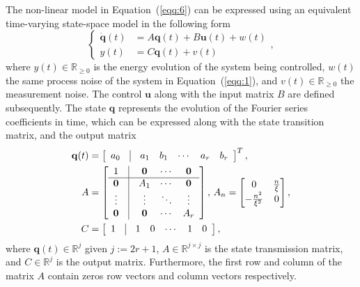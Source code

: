 \documentclass[letterpaper,10pt,conference]{ieeeconf}
\begin{document}
The non-linear model in Equation~(\ref{eqq:6}) can be expressed using an equivalent time-varying state-space model in the following form
\begin{equation}\label{eqq:7}\begin{cases}
  \dot{\mathbf{q}}(t)&=A\mathbf{q}(t)+B\mathbf{u}(t)+w(t)\\
  y(t)&=C\mathbf{q}(t)+v(t)
\end{cases},\end{equation}
where $y(t)\in\mathbb{R}_{\geq 0}$ is the energy evolution of the system being controlled, $w(t)$ the same process noise of the system in Equation~(\ref{eqq:1}), and $v(t)\in\mathbb{R}_{\geq 0}$ the measurement noise. The control $\mathbf{u}$ along with the input matrix $B$ are defined subsequently. The state $\mathbf{q}$ represents the evolution of the Fourier series coefficients in time, which can be expressed along with the state transition matrix, and the output matrix
\begin{equation}\begin{split}
  \mathbf{q}(t)&=\left[\begin{array}{ccccccc}
    a_0 & \vline & a_1 & b_1 & \cdots & a_r & b_r
  \end{array}\right]^T,\\
  A&=\left[\begin{array}{ccccc}
    1          & \vline & \mathbf{0} & \cdots & \mathbf{0} \\\hline
    \mathbf{0} & \vline & A_1        & \cdots & \mathbf{0} \\
    \vdots     & \vline & \vdots     & \ddots & \vdots     \\
    \mathbf{0} & \vline & \mathbf{0} & \cdots & A_r 
  \end{array}\right],\,A_n=\begin{bmatrix}0 & \frac{n}{\xi} \\ -\frac{n^2}{\xi^2} & 0\end{bmatrix},\\
  C&=\left[\begin{array}{ccccccc}
    1 & \vline & 1 & 0 & \cdots & 1 & 0
  \end{array}\right],
\end{split}\end{equation}
where $\mathbf{q}(t)\in\mathbb{R}^j$ given $j:=2r+1$, $A\in\mathbb{R}^{j\times j}$ is the state transmission matrix, and $C\in\mathbb{R}^j$ is the output matrix. Furthermore, the first row and column of the matrix $A$ contain zeros row vectors and column vectors respectively.
\end{document}
